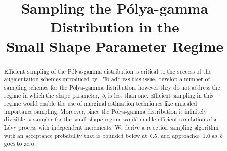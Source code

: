\documentclass[aos,preprint]{imsart}
\begin{document}
\begin{frontmatter}
\title{Sampling the P\'{o}lya-gamma Distribution in the \\ Small Shape Parameter Regime}


\begin{aug}
\author{ }
\end{aug}

\begin{abstract}
  Efficient sampling of the P\'{o}lya-gamma distribution is critical
  to the success of the augmentation schemes introduced by
  \citet{polson2013bayesian}.  To address this issue,
  \citet{windle2014sampling} develop a number of sampling schemes for
  the P\'{o}lya-gamma distribution, however they do not address the
  regime in which the shape parameter,~$b$, is less than
  one. Efficient sampling in this regime would enable the use of
  marginal estimation techniques like annealed importance
  sampling. Moreover, since the P\'{o}lya-gamma distribution is
  infinitely divisible, a sampler for the small shape regime would
  enable efficient simulation of a L\'{e}vy process with independent
  \polyagamma increments. We derive a rejection sampling algorithm
  with an acceptance probability that is bounded below at~$0.5$, and
  approaches~$1.0$ as~$b$ goes to zero.
\end{abstract}
\end{frontmatter}
\end{document}
